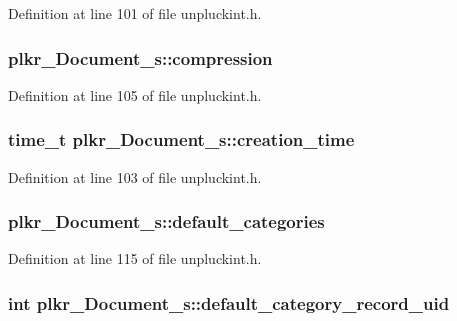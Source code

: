 Definition at line 101 of file unpluckint.\+h.

\hypertarget{structplkr__Document__s_aee6a7d3edd70fee86668477c05a45bd1}{
\subsubsection[{compression}]{ plkr\+\_\+\+Document\+\_\+s\+::compression}}\label{structplkr__Document__s_aee6a7d3edd70fee86668477c05a45bd1}


Definition at line 105 of file unpluckint.\+h.

\hypertarget{structplkr__Document__s_a0c43dd82cb77cbf9f5d879e521e1d4ee}{
\subsubsection[{creation\+\_\+time}]{\setlength{\rightskip}{0pt plus 5cm}time\+\_\+t plkr\+\_\+\+Document\+\_\+s\+::creation\+\_\+time}}\label{structplkr__Document__s_a0c43dd82cb77cbf9f5d879e521e1d4ee}


Definition at line 103 of file unpluckint.\+h.

\hypertarget{structplkr__Document__s_a2f029383d0943d3be079d88a3dccf8f3}{
\subsubsection[{default\+\_\+categories}]{ plkr\+\_\+\+Document\+\_\+s\+::default\+\_\+categories}}\label{structplkr__Document__s_a2f029383d0943d3be079d88a3dccf8f3}


Definition at line 115 of file unpluckint.\+h.

\hypertarget{structplkr__Document__s_aa5adb5548f84752427b973f322f153ec}{
\subsubsection[{default\+\_\+category\+\_\+record\+\_\+uid}]{\setlength{\rightskip}{0pt plus 5cm}int plkr\+\_\+\+Document\+\_\+s\+::default\+\_\+category\+\_\+record\+\_\+uid}}\label{structplkr__Document__s_aa5adb5548f84752427b973f322f153ec}


